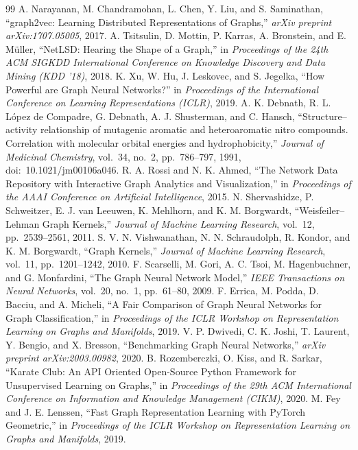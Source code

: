 \begin{thebibliography}{99}
A. Narayanan, M. Chandramohan, L. Chen, Y. Liu, and S. Saminathan,
``graph2vec: Learning Distributed Representations of Graphs,''
\emph{arXiv preprint arXiv:1707.05005}, 2017.
A. Tsitsulin, D. Mottin, P. Karras, A. Bronstein, and E. M{\"u}ller,
``NetLSD: Hearing the Shape of a Graph,''
in \emph{Proceedings of the 24th ACM SIGKDD International Conference on
Knowledge Discovery and Data Mining (KDD '18)},
2018.
K. Xu, W. Hu, J. Leskovec, and S. Jegelka,
``How Powerful are Graph Neural Networks?''
in \emph{Proceedings of the International Conference on Learning Representations (ICLR)},
2019.
A. K. Debnath, R. L. L{\'o}pez de Compadre, G. Debnath, A. J. Shusterman,
and C. Hansch,
``Structure--activity relationship of mutagenic aromatic and heteroaromatic nitro
compounds. Correlation with molecular orbital energies and hydrophobicity,''
\emph{Journal of Medicinal Chemistry}, vol.~34, no.~2, pp.~786--797, 1991,
doi:~10.1021/jm00106a046.
R. A. Rossi and N. K. Ahmed,
``The Network Data Repository with Interactive Graph Analytics and Visualization,''
in \emph{Proceedings of the AAAI Conference on Artificial Intelligence},
2015.
N. Shervashidze, P. Schweitzer, E. J. van Leeuwen, K. Mehlhorn,
and K. M. Borgwardt,
``Weisfeiler--Lehman Graph Kernels,''
\emph{Journal of Machine Learning Research}, vol.~12,
pp.~2539--2561, 2011.
S. V. N. Vishwanathan, N. N. Schraudolph, R. Kondor,
and K. M. Borgwardt,
``Graph Kernels,''
\emph{Journal of Machine Learning Research}, vol.~11,
pp.~1201--1242, 2010.
F. Scarselli, M. Gori, A. C. Tsoi, M. Hagenbuchner,
and G. Monfardini,
``The Graph Neural Network Model,''
\emph{IEEE Transactions on Neural Networks}, vol.~20, no.~1,
pp.~61--80, 2009.
F. Errica, M. Podda, D. Bacciu, and A. Micheli,
``A Fair Comparison of Graph Neural Networks for Graph Classification,''
in \emph{Proceedings of the ICLR Workshop on Representation Learning on Graphs and Manifolds},
2019.
V. P. Dwivedi, C. K. Joshi, T. Laurent, Y. Bengio,
and X. Bresson,
``Benchmarking Graph Neural Networks,''
\emph{arXiv preprint arXiv:2003.00982}, 2020.
B. Rozemberczki, O. Kiss, and R. Sarkar,
``Karate Club: An API Oriented Open-Source Python Framework for Unsupervised Learning on Graphs,''
in \emph{Proceedings of the 29th ACM International Conference on Information and Knowledge Management (CIKM)},
2020.
M. Fey and J. E. Lenssen,
``Fast Graph Representation Learning with PyTorch Geometric,''
in \emph{Proceedings of the ICLR Workshop on Representation Learning on Graphs and Manifolds},
2019.



\end{thebibliography}